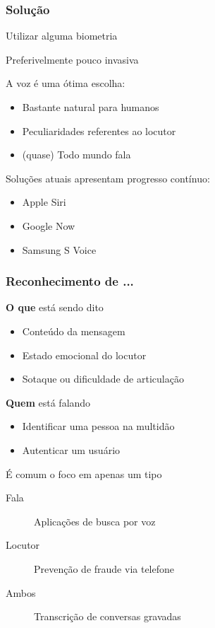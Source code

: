 \begin{frame}
\frametitle{Solução}
\begin{description}
    \item Utilizar alguma biometria
    \pause
    \item Preferivelmente pouco invasiva
    \pause
    \item A voz é uma ótima escolha:
    \pause
    \begin{itemize}
        \item Bastante natural para humanos
        \pause
        \item Peculiaridades referentes ao locutor
        \pause
        \item (quase) Todo mundo fala
        \pause
    \end{itemize}
    \item Soluções atuais apresentam progresso contínuo:
    \pause
    \begin{itemize}
        \item Apple Siri
        \pause
        \item Google Now
        \pause
        \item Samsung S Voice
    \end{itemize}
\end{description}
\end{frame}

\begin{frame}
\frametitle{Reconhecimento de ...}
\begin{description}
    \item[Fala] \textbf{O que} está sendo dito
    \pause
    \begin{itemize}
        \item Conteúdo da mensagem
        \pause
        \item Estado emocional do locutor
        \pause
        \item Sotaque ou dificuldade de articulação
        \pause
    \end{itemize}
    \item[Locutor] \textbf{Quem} está falando
    \pause
    \begin{itemize}
        \item Identificar uma pessoa na multidão
        \pause
        \item Autenticar um usuário
        \pause
    \end{itemize}
    \item É comum o foco em apenas um tipo
    \pause
    \begin{description}
        \item[Fala] Aplicações de busca por voz
        \pause
        \item[Locutor] Prevenção de fraude via telefone
        \pause
        \item[Ambos] Transcrição de conversas gravadas
    \end{description}
\end{description}
\end{frame}

